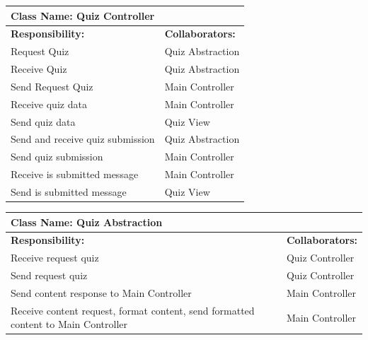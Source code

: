 \documentclass[]{article}
\begin{document}
	\begin{table}[H]
	\centering
		\begin{tabular}{|p{9cm}|p{3cm}|}
		\hline
		 \multicolumn{2}{|l|}{\textbf{Class Name: Quiz Controller}} \\
		\hline
		\textbf{Responsibility:} & \textbf{Collaborators:} \\
		\hline
	    Request Quiz & Quiz Abstraction\\
		\hline
		Receive Quiz & Quiz Abstraction\\
		\hline
	    Send Request Quiz & Main Controller\\
		\hline
		Receive quiz data & Main Controller\\
		\hline
		Send quiz data & Quiz View\\
		\hline
		Send and receive quiz submission & Quiz Abstraction\\
		\hline
		Send quiz submission & Main Controller\\
		\hline
		Receive is submitted message & Main Controller\\
		\hline
		Send is submitted message & Quiz View\\
		\hline
		\end{tabular}
	\end{table}
	
	\begin{table}[H]
	\centering
		\begin{tabular}{|p{9cm}|p{3cm}|}
		\hline
		 \multicolumn{2}{|l|}{\textbf{Class Name: Quiz Abstraction}} \\
		\hline
		\textbf{Responsibility:} & \textbf{Collaborators:} \\
		\hline
	    Receive request quiz  & Quiz Controller\\
		\hline
		Send request quiz & Quiz Controller\\
		\hline
		Send content response to Main Controller & Main Controller\\
		\hline
		Receive content request, format content, send formatted content to Main Controller & Main Controller \\
		\hline
		\end{tabular}
	\end{table}



\newpage
\appendix
\end{document}
